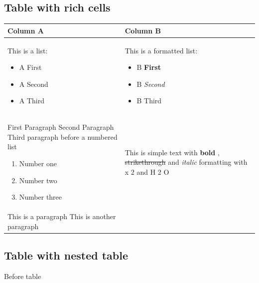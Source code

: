 \documentclass[11pt,a4paper]{article}
\begin{document}
\subsection{Table with rich cells}

\begin{table}[h]
\begin{tabular}{|l|l|}
\hline
 Column A & Column B \\ \hline
This is a list:  \begin{itemize} \item A First \item A Second \item A Third \end{itemize} & This is a formatted list:  \begin{itemize} \item B \textbf{First} \item B \textit{Second} \item B Third \end{itemize} \\ \hline
First Paragraph  Second Paragraph  Third paragraph before a numbered list  \begin{enumerate} \item Number one \item Number two \item Number three \end{enumerate} & This is simple text with  \textbf{bold}  ,  \sout{strikethrough}  and  \textit{italic}  formatting with x  2  and H  2  O \\ \hline
This is a paragraph  This is another paragraph &  \\ \hline
\end{tabular}
\end{table}

\subsection{Table with nested table}

Before table
\end{document}
